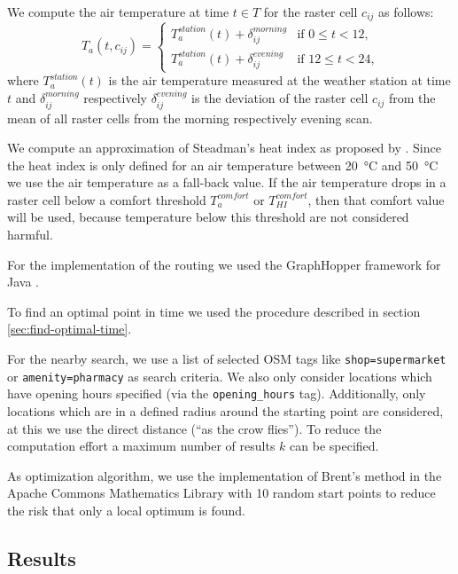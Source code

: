 We compute the air temperature at time $t\in T$ for the raster cell $c_{ij}$ as follows:
\begin{equation}
\label{eq:derived-temperature}
T_a(t, c_{ij}) = \begin{cases}
T_{a}^{station}(t) + \delta_{ij}^{morning} & \text{if $0 \leq t < 12$,}\\
T_{a}^{station}(t) + \delta_{ij}^{evening} & \text{if $12 \leq t < 24$,}
\end{cases}
\end{equation}
where $T_{a}^{station}(t)$ is the air temperature measured at the weather station at time $t$ and $\delta^{morning}_{ij}$ respectively  $\delta^{evening}_{ij}$ is the deviation of the raster cell $c_{ij}$ from the mean of all raster cells from the morning respectively evening scan.

We compute an approximation of Steadman's heat index as proposed by \textcite[77]{Stull2011}. Since the heat index is only defined for an air temperature between \SI{20}{\celsius} and \SI{50}{\celsius} we use the air temperature as a fall-back value. If the air temperature drops in a raster cell below a comfort threshold $T_a^{comfort}$ or $T_{HI}^{comfort}$, then that comfort value will be used, because temperature below this threshold are not considered harmful. 

For the implementation of the routing we used the GraphHopper framework for Java \parencite{GraphHopper2016}.


To find an optimal point in time we used the procedure described in section \ref{sec:find-optimal-time}.  

For the nearby search, we  use a list of selected OSM tags like \verb|shop=supermarket| or \verb|amenity=pharmacy| as search criteria. We also only consider locations which have opening hours specified (via the \verb|opening_hours| tag). Additionally, only locations which are in a defined radius around the starting point are considered, at this we use the direct distance (“as the crow flies”). To reduce the computation effort a maximum number of results $k$ can be specified.

As optimization algorithm, we use the implementation of Brent's method in the Apache Commons Mathematics Library \parencite{ASF2016} with 10 random start points to reduce the risk that only a local optimum is found.

\subsection{Results}

